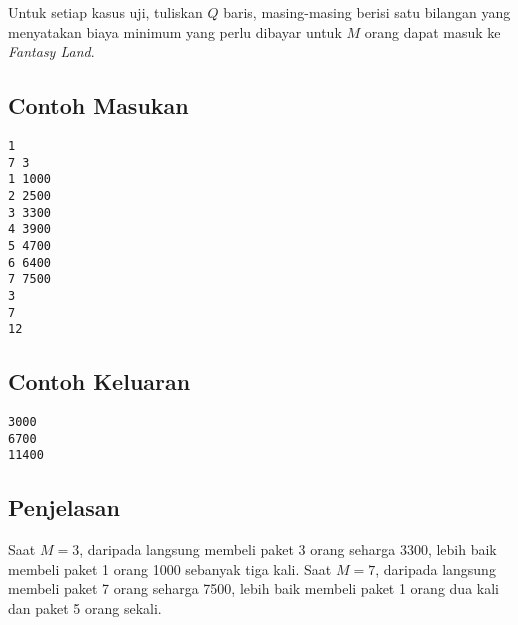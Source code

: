 \documentclass{article}
\begin{document}
Untuk setiap kasus uji, tuliskan $Q$ baris, masing-masing berisi satu bilangan yang menyatakan biaya minimum yang perlu dibayar untuk $M$ orang dapat masuk ke \textit{Fantasy Land}.

\begin{multicols}{2}
\subsection*{Contoh Masukan}
\begin{lstlisting}
1
7 3
1 1000
2 2500
3 3300
4 3900
5 4700
6 6400
7 7500
3
7
12
\end{lstlisting}
\columnbreak
\subsection*{Contoh Keluaran}
\begin{lstlisting}
3000
6700
11400
\end{lstlisting}
\vfill
\null
\end{multicols}


\subsection*{Penjelasan}

Saat $M=3$, daripada langsung membeli paket 3 orang seharga 3300, lebih baik membeli paket 1 orang 1000 sebanyak tiga kali.
Saat $M=7$, daripada langsung membeli paket 7 orang seharga 7500, lebih baik membeli paket 1 orang dua kali dan paket 5 orang sekali.

\pagebreak
\end{document}
